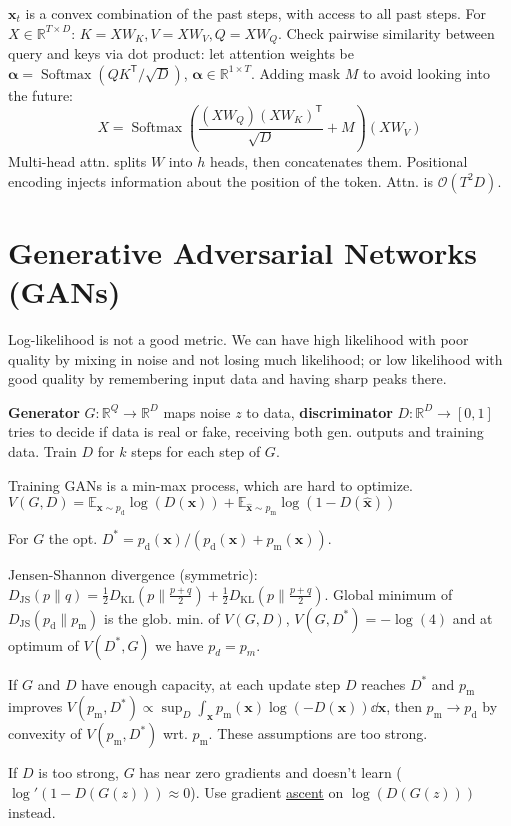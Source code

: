 \documentclass[11pt,landscape,a4paper,fleqn]{article}
\newcommand*{\tran}{^{\mathsf{T}}} %
\newcommand{\kl}[2]{D_{\mathrm{KL}}(#1\lVert#2)}
\newcommand{\js}[2]{D_{\mathrm{JS}}(#1\lVert#2)}
\newcommand{\E}{\mathbb{E}}
\DeclareMathOperator{\softmax}{\mathrm{Softmax}}
\newcommand{\R}{\mathbb{R}}
\def\myvector#1{\mathbf{#1}}
\def\vx{{\myvector{x}}}
\begin{document}
\begin{multicols*}{4}
$\vx_t$ is a convex combination of the past steps, with access to all past steps.
For $X \in \R^{T \times D}$: 
$K = XW_K, V = XW_V, Q = XW_Q$.
Check pairwise similarity between query and keys via dot product:
let attention weights be $\bm{\alpha} = \softmax(QK\tran / \sqrt{D})$, $\bm{\alpha} \in \R^{1 \times T}$.
Adding mask $M$ to avoid looking into the future:
\[X = \softmax\left(\frac{(XW_Q)(XW_K)\tran}{\sqrt{D}} + M\right)(XW_V)\]
Multi-head attn. splits $W$ into $h$ heads, then concatenates them.
Positional encoding injects information about the position of the token.
Attn. is $\mathcal{O}(T^2 D)$.

\section{Generative Adversarial Networks (GANs)}

Log-likelihood is not a good metric. We can have high likelihood with poor quality by mixing in noise and not losing much likelihood; or low likelihood with good quality by remembering input data and having sharp peaks there.

\textbf{Generator} $G : \R^Q \to \R^D$ maps noise $z$ to data,
\textbf{discriminator} $D : \R^D \to [0, 1]$ tries to decide if data is real or fake,
receiving both gen. outputs and training data.
Train $D$ for $k$ steps for each step of $G$.

Training GANs is a min-max process, which are hard to optimize.
$V(G, D) = \E_{\vx \sim p_{\mathrm{d}}} \log(D(\vx)) + \E_{\hat{\vx} \sim p_{\mathrm{m}}} \log(1 - D(\hat{\vx}))$

For $G$ the opt. $D^* = p_{\mathrm{d}}(\vx) / (p_{\mathrm{d}}(\vx) + p_{\mathrm{m}}(\vx))$.

Jensen-Shannon divergence (symmetric):
$\js{p}{q} = \frac{1}{2} \kl{p}{\frac{p + q}{2}} + \frac{1}{2} \kl{p}{\frac{p + q}{2}}$.
Global minimum of $\js{p_{\mathrm{d}}}{p_{\mathrm{m}}}$ is the glob. min. of $V(G, D)$,
$V(G, D^*) = - \log(4)$ and at optimum of $V(D^*, G)$ we have $p_d = p_m$.

If $G$ and $D$ have enough capacity, at each update step $D$ reaches $D^*$
and $p_{\mathrm{m}}$ improves $V(p_{\mathrm{m}}, D^*) \propto \sup_D \int_{\vx} p_{\mathrm{m}}(\vx) \log( - D(\vx)) \dd \vx$,
then $p_{\mathrm{m}} \to p_{\mathrm{d}}$ by convexity of $V(p_{\mathrm{m}}, D^*)$ wrt. $p_{\mathrm{m}}$.
These assumptions are too strong.

If $D$ is too strong, $G$ has near zero gradients and doesn't learn ($\log'(1 - D(G(z))) \approx 0$).
Use gradient \underline{ascent} on $\log(D(G(z)))$ instead.


\end{multicols*}
\end{document}
